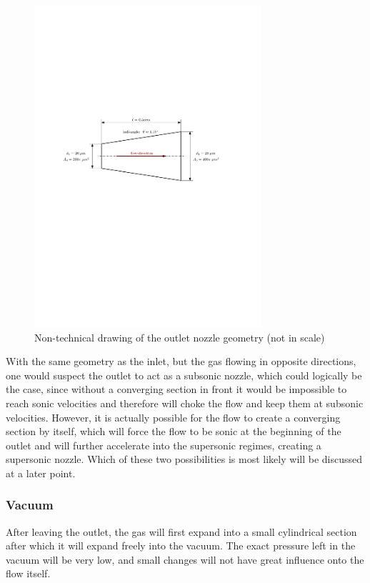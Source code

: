 	\begin{figure}[H]
	    \centering
	    \includegraphics[width=0.75\textwidth]{src/03_analytical-work/fig_outlet-nozzle-geometry.pdf}
	    \caption{Non-technical drawing of the outlet nozzle geometry (not in scale)}
	    \label{fig:geometry-outlet-nozzle}
	\end{figure}
	With the same geometry as the inlet, but the gas flowing in opposite directions, one would suspect the outlet to act as a subsonic nozzle, which could logically be the case, since without a converging section in front it would be impossible to reach sonic velocities and therefore will choke the flow and keep them at subsonic velocities.
	However, it is actually possible for the flow to create a converging section by itself, which will force the flow to be sonic at the beginning of the outlet and will further accelerate into the supersonic regimes, creating a supersonic nozzle.
	Which of these two possibilities is most likely will be discussed at a later point.
	
\subsubsection*{Vacuum}

	After leaving the outlet, the gas will first expand into a small cylindrical section after which it will expand freely into the vacuum.
	The exact pressure left in the vacuum will be very low, and small changes will not have great influence onto the flow itself.
